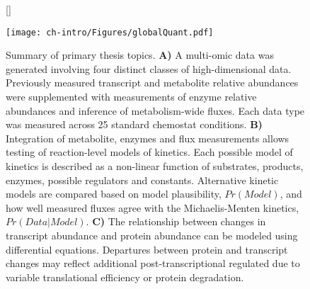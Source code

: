 \begin{figure}[h!]
[\FBwidth]
{\caption[Summary of primary thesis topics]{Summary of primary thesis topics. \textbf{A)} A multi-omic data was generated involving four distinct classes of high-dimensional data. Previously measured transcript and metabolite relative abundances \cite{Brauer:2008jn, Boer:2010fb} were supplemented with measurements of enzyme relative abundances and inference of metabolism-wide fluxes. Each data type was measured across 25 standard chemostat conditions. \textbf{B)} Integration of metabolite, enzymes and flux measurements allows testing of reaction-level models of kinetics. Each possible model of kinetics is described as a non-linear function of substrates, products, enzymes, possible regulators and constants. Alternative kinetic models are compared based on model plausibility, $Pr(Model)$, and how well measured fluxes agree with the Michaelis-Menten kinetics, $Pr(Data | Model)$. \textbf{C)} The relationship between changes in transcript abundance and protein abundance can be modeled using differential equations. Departures between protein and transcript changes may reflect additional post-transcriptional regulated due to variable translational efficiency or protein degradation.
}\label{introFig:primarytopics}}
{\texttt{[image: ch-intro/Figures/globalQuant.pdf]}}
\end{figure}

